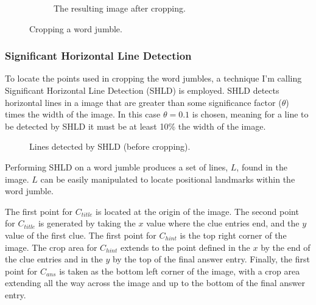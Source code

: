 \documentclass{article}
\begin{document}
\begin{figure}[h]
\begin{subfigure}{.5\textwidth}
			\caption{The resulting image after cropping.}
			\label{fig:sub2}
		\end{subfigure}
		\caption{Cropping a word jumble.}
		\label{fig:test}
	\end{figure}

	\subsubsection{Significant Horizontal Line Detection}
	To locate the points used in cropping the word jumbles, a technique I'm calling Significant Horizontal Line Detection (SHLD) is employed.  SHLD detects horizontal lines in a image that are greater than some significance factor ($\theta$) times the width of the image.  In this case $\theta = 0.1$ is chosen, meaning for a line to be detected by SHLD it must be at least 10\% the width of the image.  \par 
	
	\begin{figure}
		\centering
		\caption{Lines detected by SHLD (before cropping).}
		\vspace{-20pt}
	\end{figure}
	
	Performing SHLD on a word jumble produces a set of lines, $L$, found in the image.  $L$ can be easily manipulated to locate positional landmarks within the word jumble.  \par
	
	The first point for $C_{title}$ is located at the origin of the image.  The second point for $C_{title}$ is generated by taking the $x$ value where the clue entries end, and the $y$ value of the first clue.	The first point for $C_{hint}$ is the top right corner of the image.  The crop area for $C_{hint}$ extends to the point defined in the $x$ by the end of the clue entries and in the $y$ by the top of the final answer entry.
	Finally, the first point for $C_{ans}$ is taken as the bottom left corner of the image, with a crop area extending all the way across the image and up to the bottom of the final answer entry.
	
\end{document}
